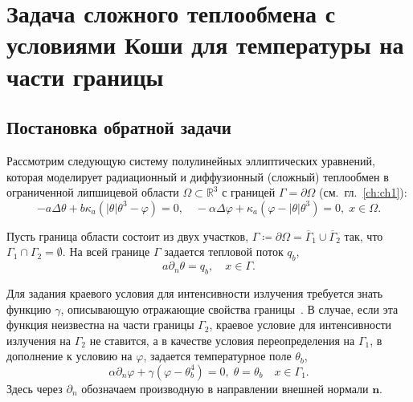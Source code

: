 \section{Задача сложного теплообмена с условиями Коши для температуры на части границы}
\label{sec:ch2/sec4}

\subsection{Постановка обратной задачи}\label{subsec:ch2/sec4/state}

Рассмотрим следующую систему полулинейных эллиптических уравнений, которая
моделирует радиационный и диффузионный (сложный) теплообмен в
ограниченной липшицевой области $\Omega\subset \mathbb{R}^3$ с границей
$\Gamma=\partial\Omega$ (см.\ гл.~\ref{ch:ch1}):
\begin{equation}
    \label{eq:2_4:eq1}
    - a\Delta\theta + b\kappa_a(|\theta|\theta^3- \varphi)=0,   \quad
    -\alpha \Delta \varphi + \kappa_a(\varphi-|\theta|\theta^3)=0,\; x\in\Omega.
\end{equation}

Пусть граница области состоит из двух участков,
$\Gamma \coloneqq \partial \Omega =\overline{\Gamma}_1 \cup \overline{\Gamma}_2$
так, что $\Gamma_1 \cap \Gamma_2 =  \emptyset$.
На всей границе $\Gamma$ задается тепловой поток $q_b$,
\begin{equation}
    \label{eq:2_4:bc1}
    a\partial_n\theta = q_b, \quad x\in \Gamma.
\end{equation}

Для задания краевого условия для интенсивности излучения
требуется знать функцию $\gamma$, описывающую отражающие свойства границы~\cite{JVM-14}.
В случае, если эта функция неизвестна на части границы $\Gamma_2$,
краевое условие для интенсивности излучения на $\Gamma_2$ не ставится, а в качестве условия
переопределения на $\Gamma_1$, в дополнение к условию на
$\varphi$, задается температурное поле $\theta_b$,
\begin{equation}
    \label{eq:2_4:bc2}
    \alpha\partial_n\varphi + \gamma (\varphi - \theta_b ^4 ) = 0,\;
    \theta=\theta_b\quad x\in \Gamma_1.
\end{equation}
Здесь через $\partial_n$ обозначаем производную в направлении
внешней нормали $\mathbf n$.

